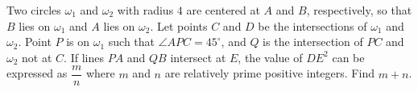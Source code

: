 Two circles $\omega_1$ and $\omega_2$ with radius $4$ are centered at $A$ and $B$, respectively, so that $B$ lies on $\omega_1$ and $A$ lies on $\omega_2$. Let points $C$ and $D$ be the intersections of $\omega_1$ and $\omega_2$. Point $P$ is on $\omega_1$ such that $\angle APC=45^{\circ}$, and $Q$ is the intersection of $PC$ and $\omega_2$ not at $C$. If lines $PA$ and $QB$ intersect at $E$, the value of $DE^2$ can be expressed as $\dfrac{m}{n}$ where $m$ and $n$ are relatively prime positive integers. Find $m+n$.
